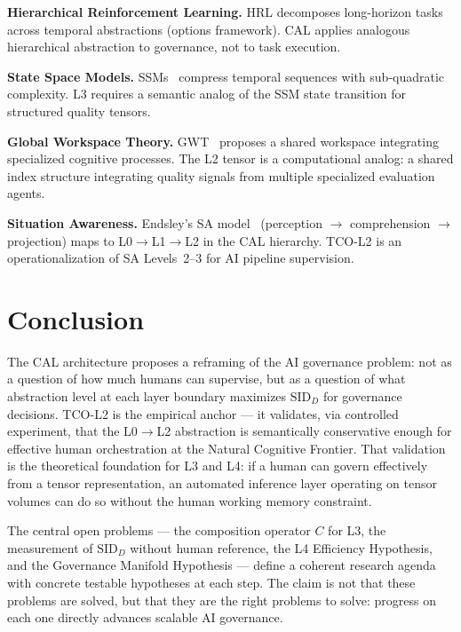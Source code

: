 \documentclass[11pt]{article}
\theoremstyle{definition}
\theoremstyle{remark}
\begin{document}
\medskip
\noindent\textbf{Hierarchical Reinforcement Learning.} HRL
decomposes long-horizon tasks across temporal abstractions (options
framework). CAL applies analogous hierarchical abstraction to
governance, not to task execution.

\medskip
\noindent\textbf{State Space Models.} SSMs~\cite{gu2023mamba}
compress temporal sequences with sub-quadratic complexity. L3
requires a semantic analog of the SSM state transition for
structured quality tensors.

\medskip
\noindent\textbf{Global Workspace Theory.} GWT~\cite{baars1988cognitive}
proposes a shared workspace integrating specialized cognitive
processes. The L2 tensor is a computational analog: a shared index
structure integrating quality signals from multiple specialized
evaluation agents.

\medskip
\noindent\textbf{Situation Awareness.} Endsley's SA
model~\cite{endsley1995} (perception $\to$ comprehension $\to$
projection) maps to L0$\to$L1$\to$L2 in the CAL hierarchy. TCO-L2
is an operationalization of SA Levels~2--3 for AI pipeline
supervision.

\section{Conclusion}

The CAL architecture proposes a reframing of the AI governance
problem: not as a question of how much humans can supervise, but as
a question of what abstraction level at each layer boundary
maximizes $\text{SID}_D$ for governance decisions. TCO-L2 is the
empirical anchor --- it validates, via controlled experiment, that
the L0$\to$L2 abstraction is semantically conservative enough for
effective human orchestration at the Natural Cognitive Frontier.
That validation is the theoretical foundation for L3 and L4: if a
human can govern effectively from a tensor representation, an
automated inference layer operating on tensor volumes can do so
without the human working memory constraint.

The central open problems --- the composition operator $C$ for L3,
the measurement of $\text{SID}_D$ without human reference, the L4
Efficiency Hypothesis, and the Governance Manifold Hypothesis ---
define a coherent research agenda with concrete testable hypotheses
at each step. The claim is not that these problems are solved, but
that they are the right problems to solve: progress on each one
directly advances scalable AI governance.


\end{document}
